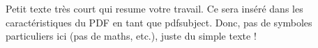 Petit texte très court qui resume votre travail. Ce sera inséré dans les caractéristiques du PDF en tant que pdfsubject. Donc, pas de symboles particuliers ici (pas de maths, etc.), juste du simple texte !